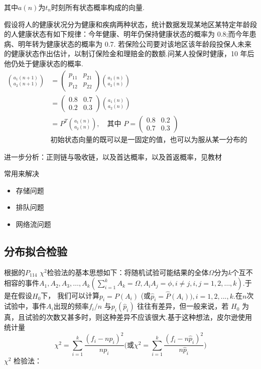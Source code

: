 \documentclass[12pt]{ctexart}
\numberwithin{equation}{section} %
\begin{document}
其中$a(n)$为$t_n$时刻所有状态概率构成的向量.
\begin{myex}
    假设将人的健康状况分为健康和疾病两种状态，统计数据发现某地区某特定年龄段的人健康状态有如下规律：今年健康、明年仍保持健康状态的概率为 0.8;而今年患病、明年转为健康状态的概率为 0.7. 若保险公司要对该地区该年龄段投保人未来的健康状态作出估计，以制订保险金和理赔金的数额.问某人投保时健康，10 年后他仍处于健康状态的概率.
    \tcblower
    $\begin{aligned}
        \binom{a_{1}(n+1)}{a_{2}(n+1)} &= \begin{pmatrix} p_{11} & p_{21} \\ p_{12} & p_{22} \end{pmatrix} \binom{a_{1}(n)}{a_{2}(n)} \\
        &=\begin{pmatrix} 0.8 & 0.7 \\ 0.2 & 0.3 \end{pmatrix}\binom{a_{1}(n)}{a_{2}(n)} \\
        &= P^T \binom{a_{1}(n)}{a_{2}(n)}, \quad \text{其中 } P = \begin{pmatrix} 0.8 & 0.2 \\ 0.7 & 0.3 
        \end{pmatrix}\\
        &\text{初始状态向量的既可以是一固定的值，也可以为服从某一分布的随机向量}\end{aligned}$
    \end{myex}
    进一步分析：正则链与吸收链，以及首达概率，以及首返概率，见教材

    常用来解决
\begin{itemize}
  \item 存储问题
  \item 排队问题

  \item 网络流问题
\end{itemize}

\subsection{分布拟合检验}
根据\cite{夏爱生}的$P_{114}$
$\chi^2$检验法的基本思想如下：将随机试验可能结果的全体$\Omega$分为$k$个互不相容的事件$A_1,A_2,A_3,\ldots,A_k\left(\sum_{i=1}^kA_k=\Omega,A_iA_j=\phi,i\neq j,i,j=1,2,\ldots,k\right).$于是在假设$H_0$下， 我们可以计算$p_i=P(A_i)$ (或$\hat{p}_i=\hat{P}(A_i)),i=1,2,...,k.$在$n$次试验中，事件$A_i$出现的频率$f_i/n$ 与$p_i(\hat{p}_i)$ 往往有差异，但一般来说，若 $H_0$ 为真，且试验的次数又甚多时，则这种差异不应该很大.基于这种想法，皮尔逊使用统计量
$$\chi^2 = \sum_{i = 1}^k \frac{( f_i-np_i )^2}{np_i}\bigg( \text{或} \chi^2 = \sum_{i = 1}^k \frac{( f_i-n\hat{p}_i )^2}{n\hat{p}_i}\bigg)$$
$\chi^2$ 检验法：
\end{document}
